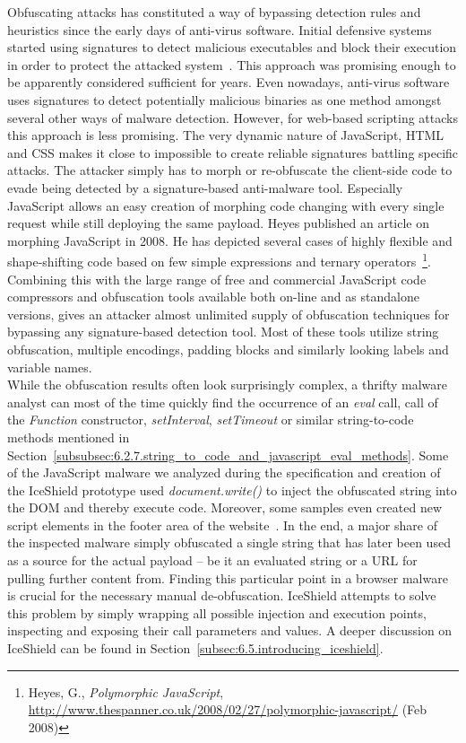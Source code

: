     Obfuscating attacks has constituted a way of bypassing detection rules and heuristics since the early days of anti-virus software. Initial defensive systems started using signatures to detect malicious executables and block their execution in order to protect the attacked system~\cite{christodorescu2003static}. This approach was promising enough to be apparently considered sufficient for years. Even nowadays, anti-virus software uses signatures to detect potentially malicious binaries as one method amongst several other ways of malware detection. However, for web-based scripting attacks this approach is less promising. The very dynamic nature of JavaScript, HTML and CSS makes it close to impossible to create reliable signatures battling specific attacks. The attacker simply has to morph or re-obfuscate the client-side code to evade being detected by a signature-based anti-malware tool. Especially JavaScript allows an easy creation of morphing code changing with every single request while still deploying 
the same payload. Heyes published an article on morphing JavaScript in 2008. He has depicted several cases of highly flexible and shape-shifting code based on few simple expressions and ternary operators~\footnote{Heyes, G., \textit{Polymorphic JavaScript}, \url{http://www.thespanner.co.uk/2008/02/27/polymorphic-javascript/} (Feb 2008)}. Combining this with the large range of free and commercial JavaScript code compressors and obfuscation tools available both on-line and as standalone versions, gives an attacker almost unlimited supply of obfuscation techniques for bypassing any signature-based detection tool. Most of these tools utilize string obfuscation, multiple encodings, padding blocks and similarly looking labels and variable names.\\

    While the obfuscation results often look surprisingly complex, a thrifty malware analyst can most of the time quickly find the occurrence of an \textit{eval} call, call of the \textit{Function} constructor, \textit{setInterval}, \textit{setTimeout} or similar string-to-code methods mentioned in Section~\ref{subsubsec:6.2.7.string_to_code_and_javascript_eval_methods}. Some of the JavaScript malware we analyzed during the specification and creation of the IceShield prototype used \textit{document.write()} to inject the obfuscated string into the DOM and thereby execute code. Moreover, some samples even created new script elements in the footer area of the website~\cite{heiderich2011iceshield}. In the end, a major share of the inspected malware simply obfuscated a single string that has later been used as a source for the actual payload -- be it an evaluated string or a URL for pulling further content from. Finding this particular point in a browser malware is crucial for the necessary manual de-obfuscation.
 IceShield attempts to solve this problem by simply wrapping all possible injection and execution points, inspecting and exposing their call parameters and values. A deeper discussion on IceShield can be found in Section~\ref{subsec:6.5.introducing_iceshield}.\\

